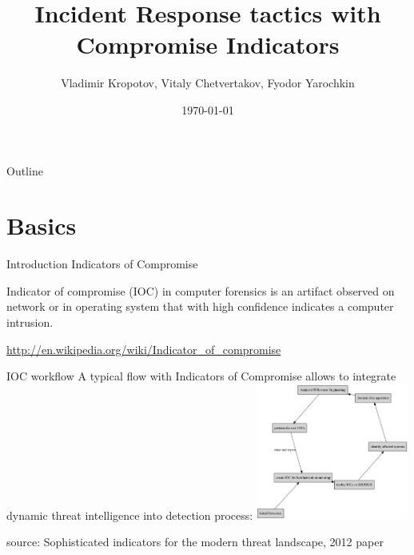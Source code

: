 \documentclass[presentation,smaller]{beamer}
\author{Vladimir Kropotov, Vitaly Chetvertakov, Fyodor Yarochkin}
\date{\today}
\title{Incident Response tactics with Compromise Indicators}
\begin{document}
\maketitle
\begin{frame}{Outline}
\tableofcontents
\end{frame}


\section{Basics}
\label{sec-1}
\begin{frame}[label=sec-1-1]{Introduction}
\alert{Indicators of Compromise}

Indicator of compromise (IOC) in computer forensics is an artifact
observed on network or in operating system that with high confidence
indicates a computer intrusion.

\url{http://en.wikipedia.org/wiki/Indicator_of_compromise}
\end{frame}


\begin{frame}[label=sec-1-2]{IOC workflow}
A typical flow with Indicators of Compromise allows
to integrate dynamic threat intelligence into detection 
process:
\includegraphics[width=5cm]{images/ioc.png}

source: Sophisticated indicators for the modern threat landscape, 2012
paper
\end{frame}
\end{document}
